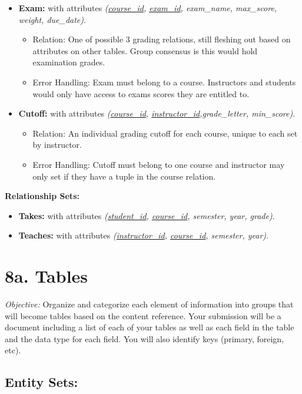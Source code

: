 \documentclass[12pt]{article}
\begin{document}
\begin{itemize}
    \item \textbf{Exam:} with attributes \textit{(\underline{course\_id}, \underline{exam\_id}, exam\_name, max\_score, weight, due\_date)}.
    \begin{itemize}
        \item Relation: One of possible 3 grading relations, still fleshing out based on attributes on other tables. Group consensus is this would hold examination grades. 
        \item Error Handling: Exam must belong to a course. Instructors and students would only have access to exams scores they are entitled to. 
    \end{itemize} 
    
    \item \textbf{Cutoff:} with attributes \textit{(\underline{course\_id}, \underline{instructor\_id},grade\_letter, min\_score)}.
        \begin{itemize}
        \item Relation: An individual grading cutoff for each course, unique to each set by instructor. 
        \item Error Handling: Cutoff must belong to one course and instructor may only set if they have a tuple in the course relation.  
    \end{itemize} 
    
\end{itemize}
\textbf{Relationship Sets:}
\begin{itemize}  
    \item \textbf{Takes:} with attributes \textit{(\underline{student\_id}, \underline{course\_id}, semester, year, grade)}.
    \item \textbf{Teaches:} with attributes \textit{(\underline{instructor\_id}, \underline{course\_id}, semester, year)}.
\end{itemize}

\section*{8a. Tables}
\textit{Objective:} Organize and categorize each element of information into groups that will become tables based on the content reference.
Your submission will be a document including a list of each of your tables as well as each field in the table and the data type for each field. You will also identify keys (primary, foreign, etc).


\subsection*{Entity Sets:}
\end{document}
